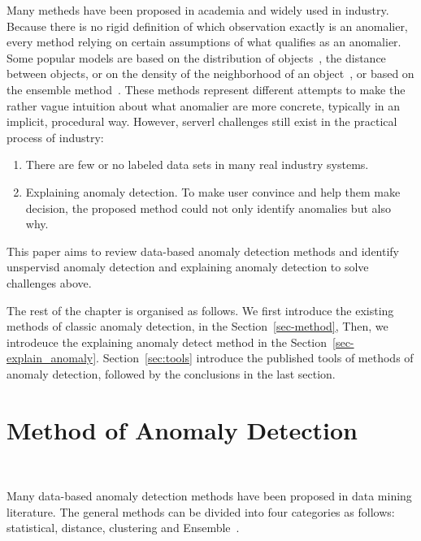 Many metheds have been proposed in academia and
widely used in industry.
Because there is no rigid definition of which
observation exactly is an anomalier,
every method relying on certain assumptions of
what qualifies as an anomalier.
Some popular models are based on
the distribution of
objects~\cite{siripanadorn2010anomaly,chandola2009anomaly,kromanis2013support},
the distance~\cite{knorr1997unified}
between objects,
or on the density of
the neighborhood of
an object~\cite{agyemang2004algorithm,breunig2000lof,papadimitriou2003loci},
or based on the ensemble method~\cite{zhou2012ensemble}.
These methods represent different attempts to make
the rather vague intuition about
what anomalier are more concrete,
typically in an implicit,
procedural way.
However,
serverl challenges still exist
in the practical  process of industry:
\begin{enumerate}
    \item There are few or no labeled data sets in
    many real industry systems.
    \item Explaining anomaly detection.
    To make  user convince and help them make decision,
    the proposed method could not only identify anomalies but also
    why.
\end{enumerate}
This paper aims to review data-based anomaly detection methods and
identify unspervisd anomaly detection and explaining anomaly detection
to solve challenges above.

The rest of the chapter is organised as follows.
We first introduce the existing methods of classic anomaly detection,
in the Section~\ref{sec-method},
Then,
we introdeuce the explaining anomaly detect method
in the Section~\ref{sec-explain_anomaly}.
Section~\ref{sec:tools} introduce the published tools of
methods of anomaly detection,
followed by the conclusions in the last section.

\section{Method of Anomaly Detection}~\label{sec-method}

Many data-based anomaly detection methods have been proposed in
data mining literature.
The general methods can be divided into four categories as follows:
statistical,
distance,
clustering and Ensemble~\cite{cook2019anomaly}.

